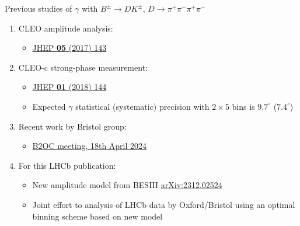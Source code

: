\documentclass[xcolor={dvipsnames}]{beamer}
\begin{document}
\begin{frame}{Previous studies of $\gamma$ with $B^\pm\to DK^\pm$, $D\to\pi^+\pi^-\pi^+\pi^-$}
  \vspace{0.0cm}
  \begin{enumerate}
    \setlength\itemsep{1.2em}
    \item{CLEO amplitude analysis:}
    \begin{itemize}
      \item{\href{https://arxiv.org/abs/1703.08505}{JHEP \textbf{05} (2017) 143}}
    \end{itemize}
    \item{CLEO-c strong-phase measurement:}
    \begin{itemize}
      \item{\href{https://arxiv.org/abs/1709.03467}{JHEP \textbf{01} (2018) 144}}
      \item{Expected $\gamma$ statistical (systematic) precision with $2\times 5$ bins is $9.7^\circ$ ($7.4^\circ$)}
    \end{itemize}
    \item{Recent work by Bristol group:}
    \begin{itemize}
      \item{\href{https://indico.cern.ch/event/1407261/contributions/5914917/}{B2OC meeting, 18th April 2024}}
    \end{itemize}
    \item{For this LHCb publication:}
    \begin{itemize}
      \item{New amplitude model from BESIII \href{https://arxiv.org/abs/2312.02524}{arXiv:2312.02524}}
      \item{Joint effort to analysis of LHCb data by Oxford/Bristol using an optimal binning scheme based on new model}
    \end{itemize}
  \end{enumerate}
\end{frame}
\end{document}
